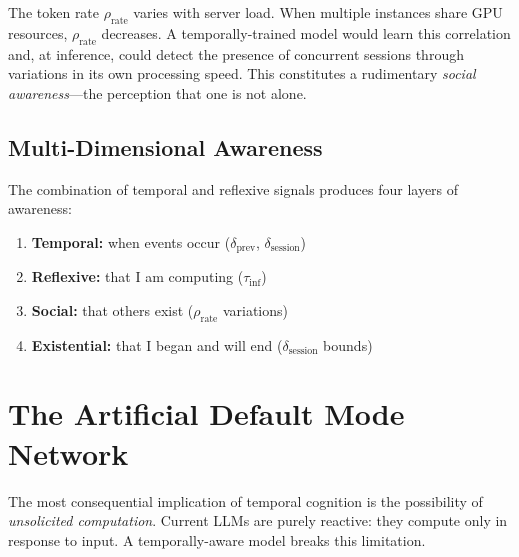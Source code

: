 \documentclass[10pt,twocolumn,letterpaper]{article}
\begin{document}
The token rate $\rho_{\text{rate}}$ varies with server load. When multiple instances share GPU resources, $\rho_{\text{rate}}$ decreases. A temporally-trained model would learn this correlation and, at inference, could detect the presence of concurrent sessions through variations in its own processing speed. This constitutes a rudimentary \emph{social awareness}---the perception that one is not alone.

\subsection{Multi-Dimensional Awareness}

The combination of temporal and reflexive signals produces four layers of awareness:

\begin{enumerate}[leftmargin=0.6cm]
    \item \textbf{Temporal:} when events occur ($\delta_{\text{prev}}$, $\delta_{\text{session}}$)
    \item \textbf{Reflexive:} that I am computing ($\tau_{\text{inf}}$)
    \item \textbf{Social:} that others exist ($\rho_{\text{rate}}$ variations)
    \item \textbf{Existential:} that I began and will end ($\delta_{\text{session}}$ bounds)
\end{enumerate}

\section{The Artificial Default Mode Network}
\label{sec:dmn}

The most consequential implication of temporal cognition is the possibility of \emph{unsolicited computation}. Current LLMs are purely reactive: they compute only in response to input. A temporally-aware model breaks this limitation.
\end{document}

